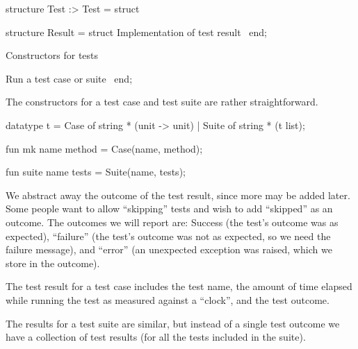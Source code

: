 \nwenddocs{}\endmoddef\nwstartdeflinemarkup\nwenddeflinemarkup
structure Test :> Test = struct

structure Result = struct
\LA{}Implementation of test result~{\nwtagstyle{}}\RA{}
end;

\LA{}Constructors for tests~{\nwtagstyle{}}\RA{}

\LA{}Run a test case or suite~{\nwtagstyle{}}\RA{}
end;
\nwendcode{}\nwdocspar

\begin{node}
The constructors for a test case and test suite are rather straightforward.
\end{node}

\nwenddocs{}\endmoddef\nwstartdeflinemarkup{}\nwenddeflinemarkup
datatype t = Case of string * (unit -> unit)
           | Suite of string * (t list);

fun mk name method = Case(name, method);

fun suite name tests = Suite(name, tests);
\eatline
{}\nwendcode{}\nwdocspar
\begin{node}
We abstract away the outcome of the test result, since more may be
added later. Some people want to allow ``skipping'' tests and wish to
add ``skipped'' as an outcome. The outcomes we will report are:
Success (the test's outcome was as expected), ``failure'' (the test's
outcome was not as expected, so we need the failure message), and
``error'' (an unexpected exception was raised, which we store in the
outcome).

The test result for a test case includes the test name, the amount of
time elapsed while running the test as measured against a ``clock'',
and the test outcome.

The results for a test suite are similar, but instead of a single test
outcome we have a collection of test results (for all the tests
included in the suite).
\end{node}

